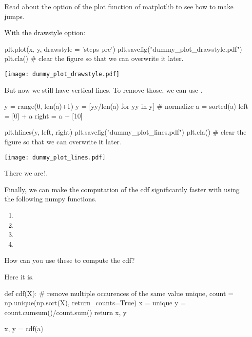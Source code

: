 \documentclass{scrartcl}
\begin{document}
\begin{exercise}
Read about the  option of  the plot function of matplotlib to see how to make jumps.
  \begin{solution}
With the drawstyle option: 
\begin{pyblock}
plt.plot(x, y,  drawstyle = 'steps-pre')
plt.savefig("dummy_plot_drawstyle.pdf")
plt.cla() # clear the figure so that we can overwrite it later.
\end{pyblock}


\begin{center}
\texttt{[image: dummy\_plot\_drawstyle.pdf]}
\end{center}

But now we still have  vertical lines. To remove those, we can use .

\begin{pyblock}
y = range(0, len(a)+1)
y = [yy/len(a) for yy in y] # normalize
a = sorted(a)
left = [0] + a
right = a + [10]

plt.hlines(y, left, right)
plt.savefig("dummy_plot_lines.pdf")
plt.cla() # clear the figure so that we can overwrite it later.
\end{pyblock}

\begin{center}
\texttt{[image: dummy\_plot\_lines.pdf]}
\end{center}

There  we are!.
  \end{solution}
\end{exercise}


\begin{exercise}
Finally, we can make the computation of the cdf significantly faster with using the following numpy functions. 
\begin{enumerate}
\item {}
\item {}
\item {}
\item {}
\end{enumerate}
How can you use these to compute the cdf?
\begin{solution}
Here it is.
\begin{pyblock}

def cdf(X):
    # remove multiple occurences of the same value
    unique, count = np.unique(np.sort(X), return_counts=True)
    x = unique
    y = count.cumsum()/count.sum()
    return x, y

x, y = cdf(a)
\end{pyblock}

\end{solution}
\end{exercise}
\end{document}
